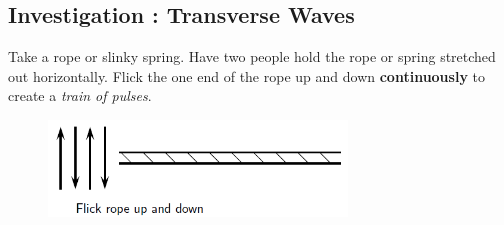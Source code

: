             \subsection{  Investigation : Transverse Waves }
            \nopagebreak
      \label{m38806*id317764}Take a rope or slinky spring. Have two people hold the rope or spring stretched out horizontally. Flick the one end of the rope up and down \textbf{continuously} to create a \textsl{train of pulses}.\par 
      \label{m38806*id317781}
    \setcounter{subfigure}{0}
	\begin{figure}[H] %
    \begin{center}
    \label{m38806*id317784!!!underscore!!!media}\label{m38806*id317784!!!underscore!!!printimage}\includegraphics[width=300px]{col11305.imgs/m38806_PG10C5_001.png} %
      \vspace{2pt}
    \vspace{.1in}
    \end{center}
 \end{figure}       
      \par 
